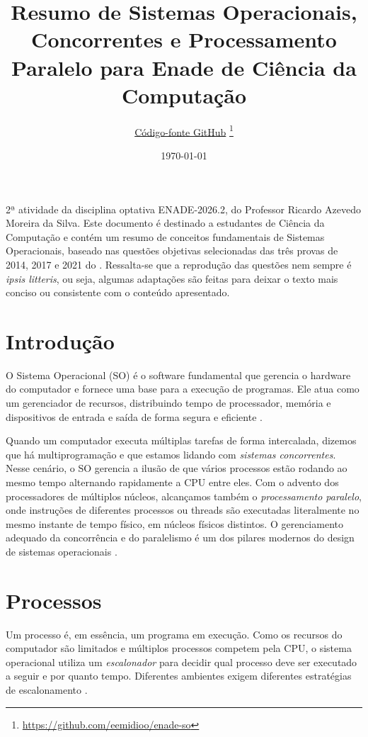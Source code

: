 \documentclass[12pt,a4paper]{article}
\title{Resumo de Sistemas Operacionais, Concorrentes e Processamento Paralelo para Enade de Ciência da Computação}
\author{
    \small\href{https://github.com/eemidioo/enade-so}{Código-fonte GitHub}%
    \thanks{\url{https://github.com/eemidioo/enade-so}}
}
\date{\today}
\begin{document}
\maketitle
2ª atividade da disciplina optativa ENADE-2026.2, do Professor Ricardo Azevedo Moreira da Silva.
Este documento é destinado a estudantes de Ciência da Computação
e contém um resumo de conceitos fundamentais de Sistemas Operacionais,
baseado nas questões objetivas selecionadas das três provas de 2014, 2017 e 2021 do .
Ressalta-se que a reprodução das questões nem sempre é \textit{ipsis litteris}, ou seja,
algumas adaptações são feitas para deixar o texto mais conciso ou consistente com o conteúdo apresentado.

\section{Introdução}
O Sistema Operacional (SO) é o software fundamental que gerencia o hardware do computador e fornece uma base para a execução de programas.
Ele atua como um gerenciador de recursos, distribuindo tempo de processador, memória e dispositivos de entrada e saída
de forma segura e eficiente \parencite[cap.~1]{tanenbaum2016}.

Quando um computador executa múltiplas tarefas de forma intercalada,
dizemos que há multiprogramação e que estamos lidando com \emph{sistemas concorrentes}.
Nesse cenário, o SO gerencia a ilusão de que vários processos estão rodando ao mesmo tempo alternando rapidamente a CPU entre eles.
Com o advento dos processadores de múltiplos núcleos, alcançamos também o \emph{processamento paralelo},
onde instruções de diferentes processos ou threads são executadas literalmente no mesmo instante de tempo físico,
em núcleos físicos distintos.
O gerenciamento adequado da concorrência e do paralelismo é um dos pilares modernos
do design de sistemas operacionais \parencite[cap.~2]{tanenbaum2016}.

\section{Processos}
Um processo é, em essência, um programa em execução.
Como os recursos do computador são limitados e múltiplos processos competem pela CPU,
o sistema operacional utiliza um \emph{escalonador} para decidir qual processo deve ser executado a seguir
e por quanto tempo.
Diferentes ambientes exigem diferentes estratégias de escalonamento \parencite[cap.~2]{tanenbaum2016}.
\end{document}
